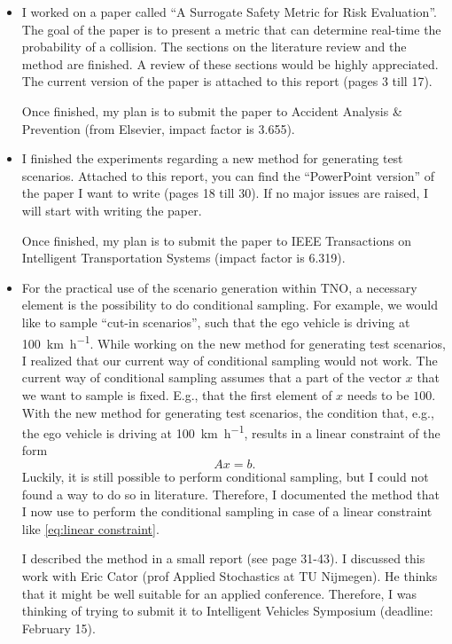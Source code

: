 \documentclass[10pt,final,a4paper,oneside,onecolumn]{article}
\begin{document}
\begin{itemize}
	\item I worked on a paper called ``A Surrogate Safety Metric for Risk Evaluation''. The goal of the paper is to present a metric that can determine real-time the probability of a collision. The sections on the literature review and the method are finished. A review of these sections would be highly appreciated. The current version of the paper is attached to this report (pages 3 till 17).
	
	Once finished, my plan is to submit the paper to Accident Analysis \& Prevention (from Elsevier, impact factor is 3.655).
	
	\item I finished the experiments regarding a new method for generating test scenarios. Attached to this report, you can find the ``PowerPoint version'' of the paper I want to write (pages 18 till 30). If no major issues are raised, I will start with writing the paper.
	
	Once finished, my plan is to submit the paper to IEEE Transactions on Intelligent Transportation Systems (impact factor is 6.319).
	
	\item For the practical use of the scenario generation within TNO, a necessary element is the possibility to do conditional sampling. For example, we would like to sample ``cut-in scenarios'', such that the ego vehicle is driving at \SI{100}{\kilo\meter\per\hour}.
	While working on the new method for generating test scenarios, I realized that our current way of conditional sampling would not work. The current way of conditional sampling assumes that a part of the vector $x$ that we want to sample is fixed. E.g., that the first element of $x$ needs to be $100$. With the new method for generating test scenarios, the condition that, e.g., the ego vehicle is driving at \SI{100}{\kilo\meter\per\hour}, results in a linear constraint of the form
	\begin{equation}
		\label{eq:linear constraint}
		Ax = b.
	\end{equation}
	Luckily, it is still possible to perform conditional sampling, but I could not found a way to do so in literature. Therefore, I documented the method that I now use to perform the conditional sampling in case of a linear constraint like \cref{eq:linear constraint}.
	
	I described the method in a small report (see page 31-43). I discussed this work with Eric Cator (prof Applied Stochastics at TU Nijmegen). He thinks that it might be well suitable for an applied conference. Therefore, I was thinking of trying to submit it to Intelligent Vehicles Symposium (deadline: February 15). 
\end{itemize}
\end{document}
